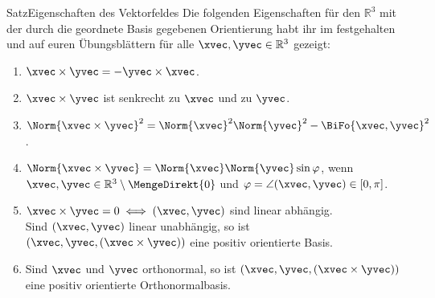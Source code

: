 \begin{Satz}
{Satz}{Eigenschaften des Vektorfeldes}
Die folgenden Eigenschaften für den $\mathbb{R}^3$ mit der durch die geordnete Basis gegebenen Orientierung habt ihr im \Skript{} festgehalten und auf euren Übungsblättern für alle $\xvec,\yvec\in\mathbb{R}^3$ gezeigt:
\begin{enumerate}
    \item $\xvec\times \yvec=-\yvec\times \xvec$.
    \item $\xvec\times\yvec$ ist senkrecht zu $\xvec$ und zu $\yvec$.
    \item $\Norm{\xvec\times\yvec}^2=\Norm{\xvec}^2\Norm{\yvec}^2-\BiFo{\xvec,\yvec}^2$.
    \item $\Norm{\xvec\times \yvec}=\Norm{\xvec}\Norm{\yvec}\sin\varphi$, wenn $\xvec,\yvec\in\mathbb{R}^3\setminus\MengeDirekt{0}$ und $\varphi=\angle(\xvec,\yvec)\in[0,\pi]$.
    \item $\xvec\times\yvec=0\iff (\xvec,\yvec)$ sind linear abhängig.\\
    Sind $(\xvec,\yvec)$ linear unabhängig, so ist $(\xvec,\yvec,(\xvec\times\yvec))$ eine positiv orientierte Basis.
    \item Sind $\xvec$ und $\yvec$ orthonormal, so ist $(\xvec,\yvec,(\xvec\times\yvec))$ eine positiv orientierte Orthonormalbasis.
\end{enumerate}
\end{Satz}
